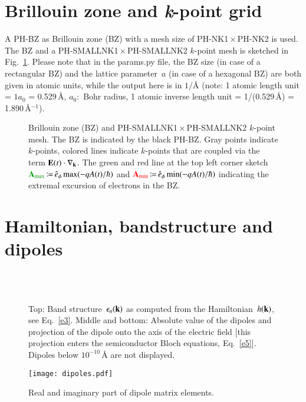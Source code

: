 \documentclass[11pt, a4paper]{scrartcl}
\newlength\figureheight
\newlength\figurewidth
\begin{document}
\section{Brillouin zone and \textit{k}-point grid}
A PH-BZ as Brillouin zone (BZ) with a mesh size of PH-NK1\,$\times$\,PH-NK2 is used. 
%
The BZ and a PH-SMALLNK1\,$\times$\,PH-SMALLNK2 $k$-point mesh is sketched in Fig.~\ref{fig:kp}.
%
Please note that in the params.py file, the BZ size (in case of a rectangular BZ) and the lattice parameter~$a$ (in case of a hexagonal BZ) are both given in atomic units, while the output here is in $1/${\AA} (note: 1 atomic length unit = $1 a_0$ = 0.529\,\AA, $a_0$:~Bohr radius, 1 atomic inverse length unit = 1/(0.529\,\AA) = 1.890\,\AA$^{-1}$). 
%
\begin{figure}
\centering
\setlength{} 
\setlength{}

\caption{Brillouin zone (BZ) and PH-SMALLNK1\,$\times$\,PH-SMALLNK2 $k$-point mesh.
%
The BZ is indicated by the black PH-BZ.
%
Gray points indicate $k$-points, colored lines indicate $k$-points that are coupled via  the term $\mathbf{E}(t)\cdot \nabla_{\mathbf{k}}$.
%
The green and red line at the top left corner sketch ${\color{darkgreen}\bA_\text{max}}\coloneqqt\hat{e}_\phi\max (-qA(t)/\hbar)$ and ${\color{red}\mathbf{A}_\text{min}}\,{\coloneqq}\,\hat{e}_\phi\min (-qA(t)/\hbar)$ indicating the extremal excursion of  electrons in the BZ.  
}
    \label{fig:kp}
\end{figure}


\section{Hamiltonian, bandstructure and dipoles}
\begin{figure}
\centering
\setlength\figureheight{6.5cm} 
\setlength\figurewidth{\textwidth}

\\[2em]

\\[2em]

\caption{Top: Band structure~$\epsilon_n(\mathbf{k})$ as computed from the Hamiltonian~$h(\mathbf{k})$, see Eq.~\eqref{e3}. 
%
Middle and bottom: Absolute value of the dipoles and projection of the dipole onto the axis of the electric field [this projection enters the semiconductor Bloch equations, Eq.~\eqref{e5}].
%
Dipoles below $10^{-10}$\,{\AA} are not displayed.
}
    \label{fig:bandstructuredipole}
\end{figure}

\begin{figure}
    \centering
    \texttt{[image: dipoles.pdf]}
    \caption{Real and imaginary part of dipole matrix elements.}
    \label{fig:dipoles}
\end{figure}
\end{document}
